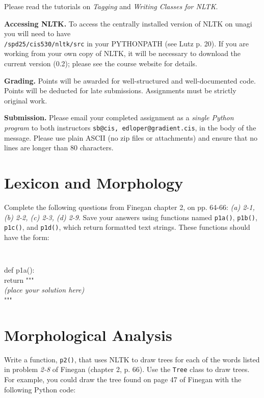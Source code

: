\documentclass{cis530}
\begin{document}
\maketitle

Please read the tutorials on \emph{Tagging} and \emph{Writing Classes
for NLTK}.

{\bf Accessing NLTK.}  
To access the centrally installed version of NLTK on unagi you will
need to have\\ \texttt{/spd25/cis530/nltk/src} in your PYTHONPATH (see
Lutz p. 20).  If you are working from your own copy of NLTK, it will
be necessary to download the current version (0.2); please see the
course website for details.

{\bf Grading.}  
Points will be awarded for well-structured and well-documented code.
Points will be deducted for late submissions.  Assignments must be
strictly original work.

{\bf Submission.}  
Please email your completed assignment as a
\emph{single Python program} to both instructors
\texttt{sb@cis, edloper@gradient.cis}, in the body of the message.
Please use plain ASCII (no zip files or attachments) and ensure
that no lines are longer than 80 characters.

\section{Lexicon and Morphology}

Complete the following questions from Finegan chapter 2, on pp. 64-66:
\emph{(a) 2-1, (b) 2-2, (c) 2-3, (d) 2-9}.  
Save your answers using functions named
\texttt{p1a()}, \texttt{p1b()}, \texttt{p1c()}, and \texttt{p1d()}, which
return formatted text strings.  These functions should have the form:

{\tt
\begin{tabbing}
def p1a():\\
\qquad return """\\
\textit{(place your solution here)}\\
"""
\end{tabbing}
}

\section{Morphological Analysis}

Write a function, \texttt{p2()}, that uses NLTK to draw trees for each
of the words listed in problem \emph{2-8} of Finegan (chapter 2,
p. 66).  Use the \texttt{Tree} class to draw trees.  For
example, you could draw the tree found on page 47 of Finegan with the
following Python code:
\end{document}
